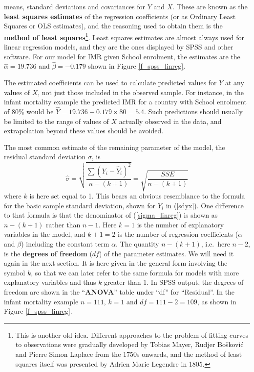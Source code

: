 means, standard deviations and covariances for $Y$ and $X$. These are
known as the \textbf{least squares estimates} of the regression
coefficients (or as Ordinary Least Squares or OLS estimates), and the
reasoning used to obtain them is the \textbf{method of least
squares}\footnote{This is another old idea. Different
approaches to the problem of fitting curves to observations were
gradually developed by Tobias Mayer, Rudjer Bo\v{s}kovi\'{c} and Pierre
Simon Laplace from the 1750s onwards, and the method of least squares
itself was presented by Adrien Marie Legendre in 1805.}. Least squares
estimates are almost always used for linear regression models, and they
are the ones displayed by SPSS and other software. For our model for IMR
given School enrolment, the estimates are the $\hat{\alpha}=19.736$ and
$\hat{\beta}=-0.179$ shown in Figure \ref{f_spss_linreg}.

The estimated coefficients can be used to calculate predicted values for
$Y$ at any values of $X$, not just those included in the observed
sample. For instance, in the infant mortality example the predicted IMR
for a country with School enrolment of 80\% would be
$\hat{Y}=19.736-0.179\times 80=5.4$. Such predictions should usually be
limited to the range of values of $X$ actually observed in the data, and
extrapolation beyond these values should be avoided.

The most common estimate of the remaining parameter of the model, the
residual standard deviation $\sigma$, is
\begin{equation}
\hat{\sigma}=
\sqrt{
\frac{\sum (Y_{i}-\hat{Y}_{i})^{2}}{n-(k+1)}
}
=\sqrt{
\frac{SSE}{n-(k+1)}
}
\label{sigma_linreg}
\end{equation}
where $k$ is here set equal to 1. This bears an obvious resemblance to the
formula for the basic sample standard deviation, shown for $Y_{i}$ in
(\ref{sdyx}). One difference to that formula is that the denominator of
(\ref{sigma_linreg}) is shown as $n-(k+1)$ rather than $n-1$. Here $k=1$
is the number of explanatory variables in the model, and $k+1=2$ is the
number of regression coefficients ($\alpha$ and $\beta$) including the
constant term $\alpha$. The quantity $n-(k+1)$, i.e.\ here $n-2$, is the
\textbf{degrees of freedom} ($df$) of the parameter estimates. We
will need it again in the next section. It is here given in the general
form involving the symbol $k$, so that we can later refer to the same
formula for models with more explanatory variables and thus $k$ greater
than 1. In SPSS output, the degrees of freedom are shown in the
``\textbf{ANOVA}'' table under ``df'' for ``Residual''. In the infant
mortality example
$n=111$, $k=1$ and $df=111-2=109$, as shown in Figure
\ref{f_spss_linreg}.


